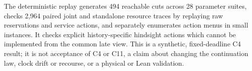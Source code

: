 \documentclass[11pt]{article}
\begin{document}
The deterministic replay generates 494 reachable cuts across 28 parameter suites, checks 2,964 paired joint and standalone resource traces by replaying raw reservations and service actions, and separately enumerates action menus in small instances. It checks explicit history-specific hindsight actions which cannot be implemented from the common late view. This is a synthetic, fixed-deadline C4 result; it is not acceptance of C4 or C11, a claim about changing the continuation law, clock drift or recourse, or a physical or Lean validation.
\end{document}
